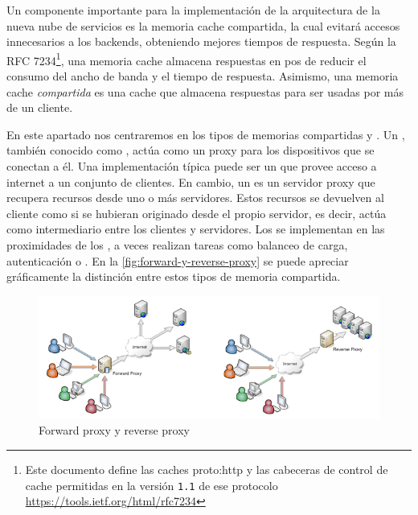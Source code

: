 Un componente importante para la implementación de la arquitectura de la nueva nube de servicios es la memoria cache compartida, la cual evitará accesos innecesarios a los backends, obteniendo mejores tiempos de respuesta.  Según la RFC 7234\footnote{Este documento define las caches \gls{proto:http} y las cabeceras de control de cache permitidas en la versión \texttt{1.1} de ese protocolo\\\url{https://tools.ietf.org/html/rfc7234}}, una memoria cache almacena respuestas en pos de reducir el consumo del ancho de banda y el tiempo de respuesta. Asimismo, una memoria cache \textit{compartida} es una cache que almacena respuestas para ser usadas por más de un cliente.

En este apartado nos centraremos en los tipos de memorias compartidas  y .  Un , también conocido como , actúa como un proxy para los dispositivos que se conectan a él.  Una implementación típica puede ser un  que provee acceso a internet a un conjunto de clientes. En cambio, un  es un servidor proxy que recupera recursos desde uno o más servidores.  Estos recursos se devuelven al cliente como si se hubieran originado desde el propio servidor, es decir, actúa como intermediario entre los clientes y servidores.  Los  se implementan en las proximidades de los , a veces realizan tareas como balanceo de carga, autenticación o . En la \autoref{fig:forward-y-reverse-proxy}  se puede apreciar gráficamente la distinción entre estos tipos de memoria compartida.

\begin{figure}[H]
  \includegraphics[width=\linewidth]{src/images/03-capitulo-3/tecnologias/squid/forward-reverse-proxy.png}
  \caption{Forward proxy y reverse proxy}
  \label{fig:forward-y-reverse-proxy}
\end{figure}

